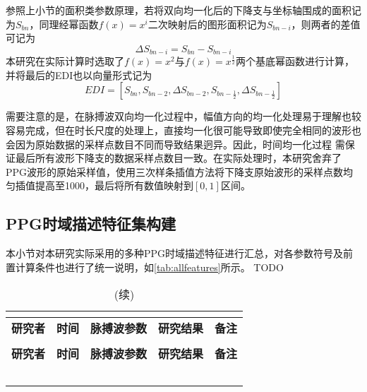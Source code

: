参照上小节的面积类参数原理，若将双向均一化后的下降支与坐标轴围成的面积记为$S_{bn}$，同理经幂函数$f(x)=x^i$二次映射后的图形面积记为$S_{bn-i}$，则两者的差值可记为
\begin{equation}
    \label{equ:sbn}
    \Delta S_{bn-i}=S_{bn}-S_{bn-i}
\end{equation}
本研究在实际计算时选取了$f(x)=x^2$与$f(x)=x^{\frac{1}{2}}$两个基底幂函数进行计算，并将最后的EDI也以向量形式记为
\begin{equation}
    \label{equ:edi}
    EDI=[S_{bn},S_{bn-2},\Delta S_{bn-2},S_{bn-\frac{1}{2}},\Delta S_{bn-\frac{1}{2}}]
\end{equation}

需要注意的是，在脉搏波双向均一化过程中，幅值方向的均一化处理易于理解也较容易完成，但在时长尺度的处理上，直接均一化很可能导致即使完全相同的波形也会因为原始数据的采样点数目不同而导致结果迥异。因此，时间均一化过程
需保证最后所有波形下降支的数据采样点数目一致。在实际处理时，本研究舍弃了PPG波形的原始采样值，使用三次样条插值方法将下降支原始波形的采样点数均匀插值提高至1000，最后将所有数值映射到$[0,1]$区间。

\subsection{PPG时域描述特征集构建}
本小节对本研究实际采用的多种PPG时域描述特征进行汇总，对各参数符号及前置计算条件也进行了统一说明，如\autoref{tab:allfeatures}所示。
TODO
\begin{center}
    \fontsize{10}{4}
	\begin{longtable}{p{3cm}<{\centering}p{1cm}<{\centering}p{2cm}<{\centering}p{6cm}<{\centering}p{1cm}<{\centering}}
		\caption{本研究使用的所有PPG时域指标一览}\\
		\label{tab:allfeatures}\\
		\hline\hline
            \textbf{研究者}&\textbf{时间}&\textbf{脉搏波参数}&\textbf{研究结果}&\textbf{备注}\\
        \hline
        \endfirsthead
        \caption[]{(续)}\\
        \hline
            \textbf{研究者}&\textbf{时间}&\textbf{脉搏波参数}&\textbf{研究结果}&\textbf{备注}\\
        \hline
        \endhead 
        \hline
        \endfoot
        \hline\hline
        \endlastfoot
        &       &       &       &  \\
        &       &       &       &  \\
        &       &       &       &  \\
        &       &       &       &  \\
        &       &       &       &  \\
	\end{longtable}
\end{center}
